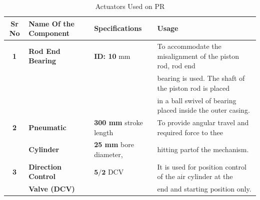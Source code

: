         \begin{table}[h]

            \caption {Actuators Used on PR} \label{Actuators_K}  \small
            \begin{tabular}{|c|l|l|l|}
                \hline  \hline
                \textbf{Sr No}  & \textbf{Name Of the Component}& \textbf{Specifications}               & \textbf{Usage}                                                   \\ \hline    \hline
                \textbf{1}      & \textbf{Rod End Bearing}      & \textbf{ID: 10 }mm                    & To accommodate the misalignment of the piston rod, rod end       \\
                                &                               &                                       & bearing is used. The shaft of the piston rod is placed           \\ 
                                &                               &                                       & in a ball swivel of bearing placed inside the outer casing.      \\ \hline
                \textbf{2}      & \textbf{Pneumatic }           & \textbf{300 mm} stroke length         & To provide angular travel and required force to thee             \\
                                & \textbf{Cylinder}             & \textbf{25 mm} bore diameter,         & hitting partof the mechanism.                                    \\ \hline 
                \textbf{3}      & \textbf{Direction Control}    & $\textbf{5/2}$ DCV                    & It is used for position control of the air cylinder at the       \\
                                & \textbf{Valve (DCV)}          &                                       & end and starting position only.                                  \\ \hline    \hline   
            \end{tabular}

        \end{table}


